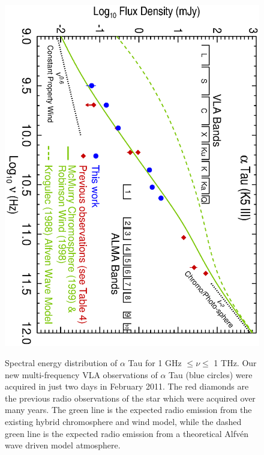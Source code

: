 \documentclass[iop]{emulateapj}
\begin{document}
\begin{figure}
\includegraphics[trim = 0mm 0mm 0mm 20mm, clip,scale=0.65, angle=90]{fig1.ps}
\\
\caption{Spectral energy distribution of $\alpha$ Tau for 1 GHz $\leq \nu \leq$ 1 THz. Our new multi-frequency VLA observations of $\alpha$ Tau (blue circles) were acquired in just two days in February 2011. The red diamonds are the previous radio observations of the star which were acquired over many years. The green line is the expected radio emission from the existing hybrid chromosphere and wind model, while the dashed  green line is the expected radio emission from a theoretical Alfv\'en wave driven model atmosphere.}
\label{fig:fig2}
\end{figure}
\end{document}
